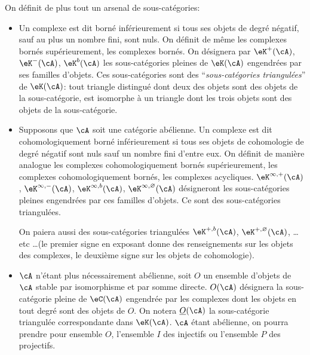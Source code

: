 On définit de plus tout un arsenal de sous-catégories: 
\begin{itemize}
  \item Un complexe est dit borné inférieurement si tous ses objets de 
    degré négatif, sauf au plus un nombre fini, sont nuls. On définit de 
    même les complexes bornés supérieurement, les complexes bornés. On 
    désignera par $\eK^+(\cA)$, $\eK^-(\cA)$, $\eK^b(\cA)$ les 
    sous-catégories pleines de $\eK(\cA)$ engendrées par ses familles 
    d'objets. Ces sous-catégories sont des ``\emph{sous-catégories 
    triangulées}'' de $\eK(\cA)$: tout triangle distingué dont deux des 
    objets sont des objets de la sous-catégorie, est isomorphe à un 
    triangle dont les trois objets sont des objets de la sous-catégorie. 
  \item Supposons que $\cA$ soit une catégorie abélienne. Un complexe est 
    dit cohomologiquement borné inférieurement si tous ses objets de 
    cohomologie de degré négatif sont nuls sauf un nombre fini d'entre 
    eux. On définit de manière analogue les complexes cohomologiquement 
    bornés supérieurement, les complexes cohomologiquement bornés, les 
    complexes acycliques. $\eK^{\infty,+}(\cA)$, $\eK^{\infty,-}(\cA)$, 
    $\eK^{\infty,b}(\cA)$, $\eK^{\infty,\varnothing}(\cA)$ désigneront les 
    sous-catégories pleines engendrées par ces familles d'objets. Ce sont 
    des sous-catégories triangulées. 
    
    On paiera aussi des sous-catégories triangulées $\eK^{+,b}(\cA)$, 
    $\eK^{+,\varnothing}(\cA)$, \ldots etc \ldots (le premier signe en 
    exposant donne des renseignements sur les objets des complexes, le 
    deuxième signe sur les objets de cohomologie). 
  \item $\cA$ n'étant plus nécessairement abélienne, soit $O$ un 
    ensemble d'objets de $\cA$ stable par isomorphisme et par somme directe. 
    $O(\cA)$ désignera la sous-catégorie pleine de $\eC(\cA)$ engendrée 
    par les complexes dont les objets en tout degré sont des objets de $O$. 
    On notera $\underline O(\cA)$ la sous-catégorie triangulée 
    correspondante dans $\eK(\cA)$. $\cA$ étant abélienne, on pourra 
    prendre pour ensemble $O$, l'ensemble $I$ des injectifs ou l'ensemble $P$ 
    des projectifs. 
\end{itemize}





\subsubsection{}\label{VIII:1-2-4}

